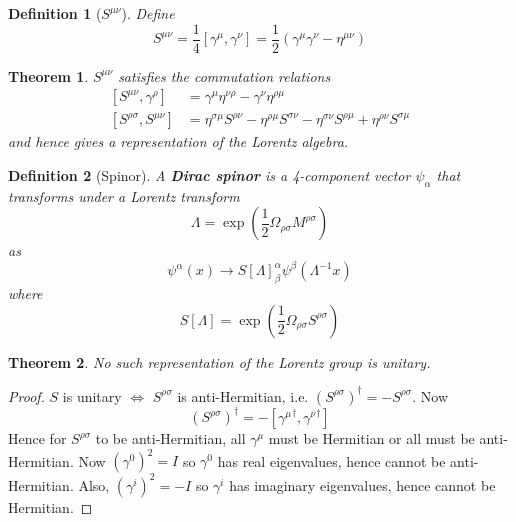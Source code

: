 \documentclass{article}
\newtheorem{theorem}{Theorem}[subsection]
\newtheorem{definition}{Definition}[subsection]
\newcommand{\bam}[1]{\textbf{#1}}
\newcommand{\comm}[2][]{\left[ #1, #2 \right]} %
\begin{document}
\begin{definition}[$S^{\mu\nu}$]
Define
\[
S^{\mu\nu}=\frac{1}{4}\comm[\gamma^\mu]{\gamma^\nu}=\frac{1}{2}\left( \gamma^\mu \gamma^\nu -\eta^{\mu\nu} \right)
\]
\end{definition}

\begin{theorem}
$S^{\mu\nu}$ satisfies the commutation relations
\begin{align*}
\comm[S^{\mu\nu}]{\gamma^\rho} &= \gamma^\mu \eta^{\nu\rho}-\gamma^\nu \eta^{\rho\mu} \\
\comm[S^{\rho\sigma}]{S^{\mu\nu}} &= \eta^{\sigma\mu}S^{\rho\nu}-\eta^{\rho\mu}S^{\sigma\nu}-\eta^{\sigma\nu}S^{\rho\mu}+\eta^{\rho\nu}S^{\sigma\mu}
\end{align*}
and hence gives a representation of the Lorentz algebra.
\end{theorem}

\begin{definition}[Spinor]
A \bam{Dirac spinor} is a 4-component vector $\psi_\alpha$ that transforms under a Lorentz transform 
\[
\Lambda=\exp\left(\frac{1}{2}\Omega_{\rho\sigma}M^{\rho\sigma}\right)
\]
as 
\[
\psi^{\alpha}(x)\to S[\Lambda]_{\beta}^{\alpha}\psi^{\beta}\left(\Lambda^{-1}x\right)
\]
where
\[
S[\Lambda]=\exp\left(\frac{1}{2}\Omega_{\rho\sigma}S^{\rho\sigma}\right)
\]
\end{definition}

\begin{theorem}
No such representation of the Lorentz group is unitary.
\end{theorem}
\begin{proof}
$S$ is unitary $\iff$ $S^{\rho\sigma}$ is anti-Hermitian, i.e. $\left( S^{\rho\sigma} \right)^\dagger = -S^{\rho\sigma}$. Now 
\[
\left( S^{\rho\sigma} \right)^\dagger = -\comm[{\gamma^\mu}^\dagger]{{\gamma^\nu}^\dagger}
\]
Hence for $S^{\rho\sigma}$ to be anti-Hermitian, all $\gamma^\mu$ must be Hermitian or all must be anti-Hermitian. Now $(\gamma^0)^2=I$ so $\gamma^0$ has real eigenvalues, hence cannot be anti-Hermitian. Also, $(\gamma^i)^2=-I$ so $\gamma^i$ has imaginary eigenvalues, hence cannot be Hermitian. 
\end{proof}
\end{document}
